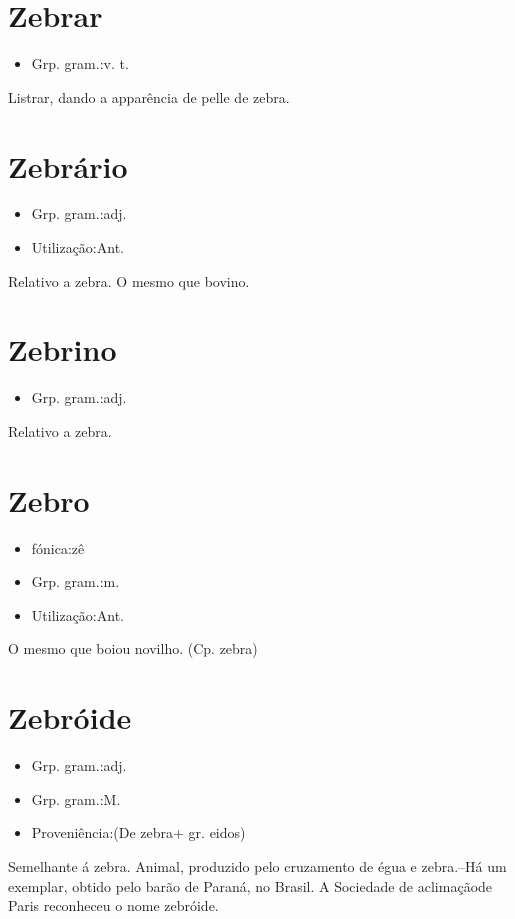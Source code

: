 \section{Zebrar}
\begin{itemize}
\item {Grp. gram.:v. t.}
\end{itemize}
Listrar, dando a apparência de pelle de zebra.
\section{Zebrário}
\begin{itemize}
\item {Grp. gram.:adj.}
\end{itemize}
\begin{itemize}
\item {Utilização:Ant.}
\end{itemize}
Relativo a zebra.
O mesmo que \textunderscore bovino\textunderscore .
\section{Zebrino}
\begin{itemize}
\item {Grp. gram.:adj.}
\end{itemize}
Relativo a zebra.
\section{Zebro}
\begin{itemize}
\item {fónica:zê}
\end{itemize}
\begin{itemize}
\item {Grp. gram.:m.}
\end{itemize}
\begin{itemize}
\item {Utilização:Ant.}
\end{itemize}
O mesmo que \textunderscore boi\textunderscore  ou \textunderscore novilho\textunderscore .
(Cp. \textunderscore zebra\textunderscore )
\section{Zebróide}
\begin{itemize}
\item {Grp. gram.:adj.}
\end{itemize}
\begin{itemize}
\item {Grp. gram.:M.}
\end{itemize}
\begin{itemize}
\item {Proveniência:(De \textunderscore zebra\textunderscore  + gr. \textunderscore eidos\textunderscore )}
\end{itemize}
Semelhante á zebra.
Animal, produzido pelo cruzamento de égua e zebra.--Há um exemplar, obtido pelo barão de Paraná, no Brasil. A \textunderscore Sociedade de aclimação\textunderscore  de Paris reconheceu o nome \textunderscore zebróide\textunderscore .
